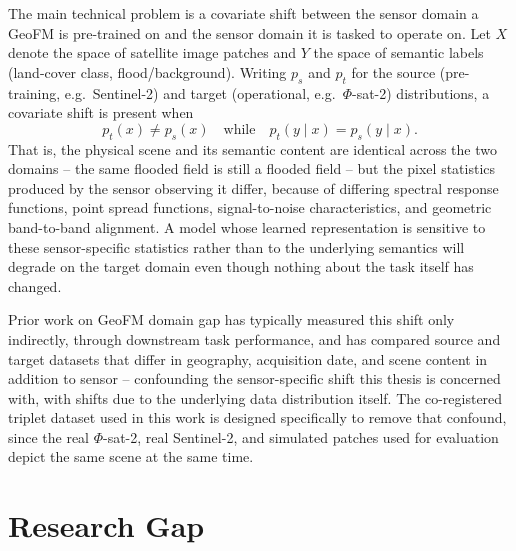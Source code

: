 The main technical problem is a covariate shift between the sensor domain a GeoFM is pre-trained on and the sensor domain it is tasked to operate on.
Let $X$ denote the space of satellite image patches and $Y$ the space of semantic labels (land-cover class, flood/background).
Writing $p_s$ and $p_t$ for the source (pre-training, e.g.\ Sentinel-2) and target (operational, e.g.\ $\Phi$-sat-2) distributions, a covariate shift is present when
\begin{equation}
    p_t(x) \neq p_s(x) \quad \text{while} \quad p_t(y \mid x) = p_s(y \mid x).
    \label{eq:covariate-shift}
\end{equation}
That is, the physical scene and its semantic content are identical across the two domains -- the same flooded field is still a flooded field -- but the pixel statistics produced by the sensor observing it differ, because of differing spectral response functions, point spread functions, signal-to-noise characteristics, and geometric band-to-band alignment.
A model whose learned representation is sensitive to these sensor-specific statistics rather than to the underlying semantics will degrade on the target domain even though nothing about the task itself has changed.

Prior work on GeoFM domain gap has typically measured this shift only indirectly, through downstream task performance, and has compared source and target datasets that differ in geography, acquisition date, and scene content in addition to sensor -- confounding the sensor-specific shift this thesis is concerned with, with shifts due to the underlying data distribution itself.
The co-registered triplet dataset used in this work is designed specifically to remove that confound, since the real $\Phi$-sat-2, real Sentinel-2, and simulated patches used for evaluation depict the same scene at the same time.

\section{Research Gap}
\label{sec:research-gap}

